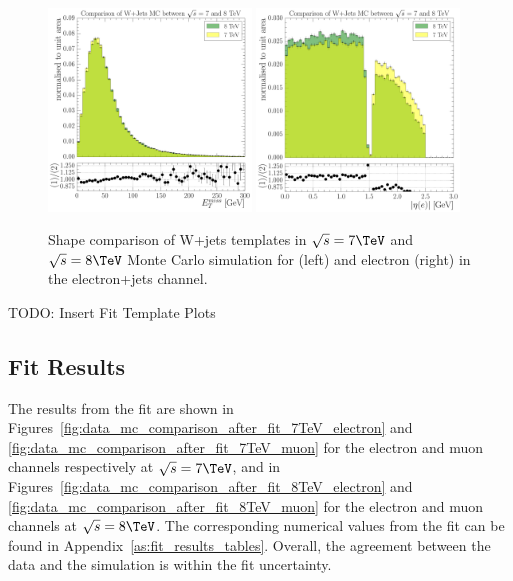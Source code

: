 \begin{figure}[hbtp]
    \centering
     \includegraphics[width=0.48\textwidth]{Chapters/04_Analysis/04b_XSections/images/WJets_comparison/TTbar_plus_X_analysis_EPlusJets_Refselection_MET_patType1CorrectedPFMet_MET_0orMoreBtag.pdf}\hfill
     \includegraphics[width=0.48\textwidth]{Chapters/04_Analysis/04b_XSections/images/WJets_comparison/TTbar_plus_X_analysis_EPlusJets_Refselection_Electron_electron_AbsEta_0orMoreBtag.pdf}\\
	 \caption{Shape comparison of W+jets templates in $\sqrt{s}=7\TeV$ and $\sqrt{s}=8\TeV$ Monte Carlo
	 simulation for \met (left) and electron \abseta (right) in the electron+jets channel.}
     \label{fig:wjets_7TeV_8TeV_comparison}
\end{figure}

TODO: Insert Fit Template Plots

\subsection{Fit Results}
\label{ss:fit_results}
The results from the fit are shown in Figures~\ref{fig:data_mc_comparison_after_fit_7TeV_electron} and
\ref{fig:data_mc_comparison_after_fit_7TeV_muon} for the electron and muon channels respectively at
$\sqrt{s}=7\TeV$, and in Figures~\ref{fig:data_mc_comparison_after_fit_8TeV_electron} and
\ref{fig:data_mc_comparison_after_fit_8TeV_muon} for the electron and muon channels at $\sqrt{s}=8\TeV$. The
corresponding numerical values from the fit can be found in Appendix~\ref{as:fit_results_tables}. Overall, the
agreement between the data and the simulation is within the fit uncertainty. 

